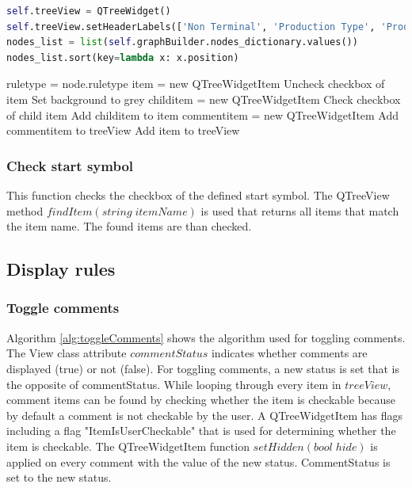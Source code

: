 \begin{lstlisting}[language=Python, basicstyle=\scriptsize	,caption= Init Tree View,label= lst:ImplementationInitTreeView]
self.treeView = QTreeWidget()
self.treeView.setHeaderLabels(['Non Terminal', 'Production Type', 'Production'])
nodes_list = list(self.graphBuilder.nodes_dictionary.values())
nodes_list.sort(key=lambda x: x.position)
\end{lstlisting}

\begin{algorithm}[H]
\caption{GUI Algorithm: init\textunderscore tree\textunderscore view}
\label{alg:initTreeView}
\begin{algorithmic}[1] 
	\State rule\textunderscore type = node.rule\textunderscore type
	\State item = new QTreeWidgetItem
    \State Uncheck checkbox of item 
    \State Set background to grey
		\State child\textunderscore item = new QTreeWidgetItem
		\State Check checkbox of child item
		\State Add child\textunderscore item to item
	\EndFor    
		\State comment\textunderscore item = new QTreeWidgetItem
		\State Add comment\textunderscore item to treeView
	\EndIf
	\State Add item to treeView
\EndFor
\end{algorithmic}
\end{algorithm}
	
\subsubsection{Check start symbol}\label{sec:ImplementationGUIStartsymbol}

This function checks the checkbox of the defined start symbol. The QTreeView method $findItem(string\; itemName)$ is used that returns all items that match the item name. 
The found items are than checked.

\subsection{Display rules}\label{sec:ImplementationGUIDisplayRules}

\subsubsection{Toggle comments}\label{sec:ImplementationGUIToggleComments}

Algorithm \ref{alg:toggleComments} shows the algorithm used for toggling comments.
The View class attribute $commentStatus$ indicates whether comments are displayed (true) or not (false). For toggling comments, a new status is set that is the opposite of commentStatus. While looping through every item in $treeView$, comment items can be found by checking whether the item is checkable because by default a comment is not checkable by the user. A QTreeWidgetItem has flags including a flag "ItemIsUserCheckable" that is used for determining whether the item is checkable. The QTreeWidgetItem function $setHidden(bool\;hide)$ is applied on every comment with the value of the new status. CommentStatus is set to the new status. 


